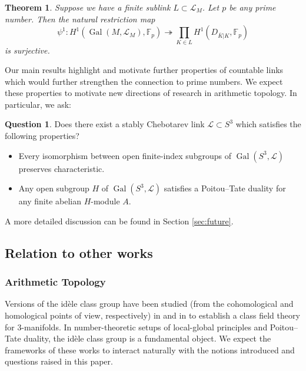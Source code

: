 \documentclass{amsart}
\theoremstyle{plain}
\theoremstyle{definition}
\theoremstyle{plain}
\theoremstyle{plain}
\theoremstyle{plain}
\theoremstyle{remark}
\theoremstyle{remark}
\theoremstyle{plain}
\theoremstyle{definition}
\newtheorem{question}[theorem]{Question}
\theoremstyle{plain}
\DeclareMathOperator{\Gal}{\mathrm{Gal}}
\newcounter{main}
\theoremstyle{plain}
\newtheorem{mainthm}[main]{\textbf{Theorem}}
\theoremstyle{plain}
\numberwithin{equation}{section}
\begin{document}
\begin{mainthm}\label{thm:mainsurjective}
Suppose we have a finite sublink $L \subset \mathcal{L}_M$. Let $p$ be any prime number. Then the natural restriction map
\begin{equation}
   \psi^1: H^1(\Gal(M, \mathcal{L}_M), \mathbb{F}_p) \twoheadrightarrow \prod_{K \in L}H^1(D_{\overline{K}|K}, \mathbb{F}_p)
\end{equation}
is surjective.
\end{mainthm}

Our main results highlight and motivate further properties of countable links which would further strengthen the connection to prime numbers. We expect these properties to motivate new directions of research in arithmetic topology. In particular, we ask:

\begin{question}
Does there exist a stably Chebotarev link $\mathcal{L} \subset S^3$ which satisfies the following properties?
\begin{itemize}
    \item Every isomorphism between open finite-index subgroups of $\Gal(S^3,\mathcal{L})$ preserves characteristic. 
    \item Any open subgroup $H$ of $\Gal(S^3,\mathcal{L})$ satisfies a Poitou--Tate duality for any finite abelian $H$-module $A$. 
\end{itemize}
\end{question}

A more detailed discussion can be found in Section \ref{sec:future}.

\subsection{Relation to other works}

\subsubsection{Arithmetic Topology}

Versions of the id\`ele class group have been studied (from the cohomological and homological points of view, respectively) in \cite{mihara} and in \cite{uekiniibo, niibo} to establish a class field theory for 3-manifolds. In number-theoretic setups of local-global principles and Poitou--Tate duality, the id\`ele class group is a fundamental object. We expect the frameworks of these works to interact naturally with the notions introduced and questions raised in this paper. 
\end{document}
